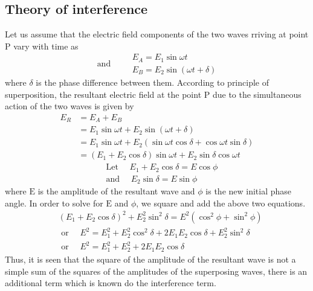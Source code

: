 \subsection{Theory of interference}
Let us assume that the electric field components of the two waves rriving at point P vary with time as
$$
\text { and } \quad \begin{aligned}
&E_{A}=E_{1} \sin \omega t \\
&E_{B}=E_{2} \sin (\omega t+\delta)
\end{aligned}
$$
where $\delta$ is the phase difference between them. According to principle of superposition, the resultant electric field at the point P due to the simultaneous action of the two waves is given by
$$
\begin{aligned}
E_{R} &=E_{A}+E_{B} \\
&=E_{1} \sin \omega t+E_{2} \sin (\omega t+\delta) \\
&=E_{1} \sin \omega t+E_{2}(\sin \omega t \cos \delta+\cos \omega t \sin \delta) \\
&=\left(E_{1}+E_{2} \cos \delta\right) \sin \omega t+E_{2} \sin \delta \cos \omega t
\end{aligned}
$$
$$\begin{aligned}
&\text { Let } \quad E_{1}+E_{2} \cos \delta=E \cos \phi \\
&\text { and } \quad E_{2} \sin \delta=E \sin \phi
\end{aligned}$$
where $\mathrm{E}$ is the amplitude of the resultant wave and $\phi$ is the new initial phase angle. In order to solve for $\mathrm{E}$ and $\phi$, we square and add the above  two equations.
$$
\begin{aligned}
&\left(E_{1}+E_{2} \cos \delta\right)^{2}+E_{2}^{2} \sin ^{2} \delta=E^{2}\left(\cos ^{2} \phi+\sin ^{2} \phi\right) \\
&\text { or } \quad E^{2}=E_{1}^{2}+E_{2}^{2} \cos ^{2} \delta+2 E_{1} E_{2} \cos \delta+E_{2}^{2} \sin ^{2} \delta \\
&\text { or } \quad E^{2}=E_{1}^{2}+E_{2}^{2}+2 E_{1} E_{2} \cos \delta
\end{aligned}
$$
Thus, it is seen that the square of the amplitude of the resultant wave is not a simple sum of the squares of the amplitudes of the superposing waves, there is an additional term which is known do the interference term.
